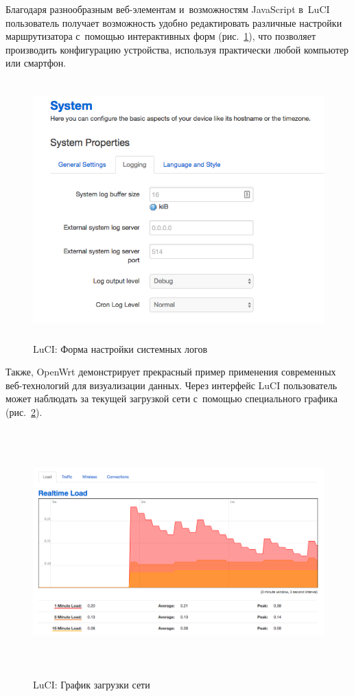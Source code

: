 Благодаря разнообразным веб-элементам и~возможностям JavaScript в~LuCI пользователь получает возможность удобно редактировать различные настройки маршрутизатора с~помощью интерактивных форм (рис.~\ref{fig:openwrt-logging-settings}), что позволяет производить конфигурацию устройства, используя практически любой компьютер или смартфон.

\begin{figure}[h!]
  \centering
  \includegraphics[height=10cm]{img/openwrt-logging-settings}
  \vspace*{12pt}
  \caption{LuCI: Форма настройки системных логов}\label{fig:openwrt-logging-settings}
\end{figure}

Также, OpenWrt демонстрирует прекрасный пример применения современных веб-технологий для визуализации данных. Через интерфейс LuCI пользователь может наблюдать за текущей загрузкой сети с~помощью специального графика (рис.~\ref{fig:openwrt-load-graph}).

\begin{figure}[h!]
  \centering
  \includegraphics[height=9.5cm]{img/openwrt-load-graph}
  \vspace*{0pt}
  \caption{LuCI: График загрузки сети}\label{fig:openwrt-load-graph}
\end{figure}

